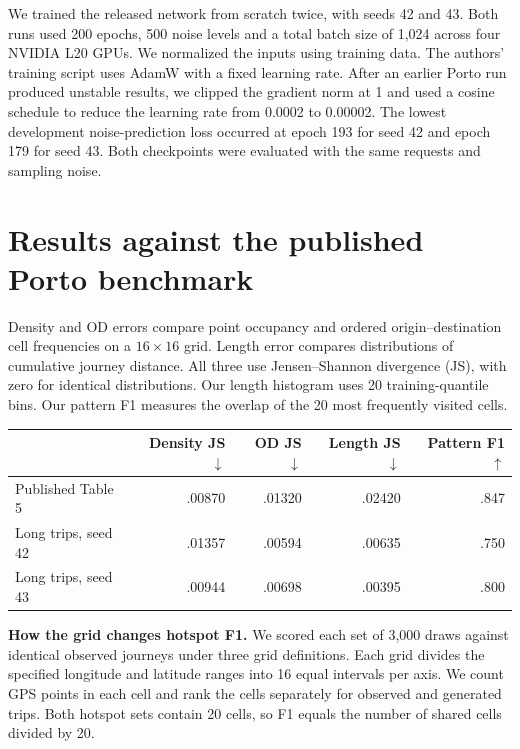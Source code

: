 \documentclass[11pt,a4paper]{article}
\begin{document}
We trained the released network from scratch twice, with seeds 42 and 43. Both runs used 200 epochs, 500 noise levels and a total batch size of 1,024 across four NVIDIA L20 GPUs. We normalized the inputs using training data. The authors' training script uses AdamW with a fixed learning rate. After an earlier Porto run produced unstable results, we clipped the gradient norm at 1 and used a cosine schedule to reduce the learning rate from 0.0002 to 0.00002. The lowest development noise-prediction loss occurred at epoch 193 for seed 42 and epoch 179 for seed 43. Both checkpoints were evaluated with the same requests and sampling noise.

\newpage
\section*{Results against the published Porto benchmark}
Density and OD errors compare point occupancy and ordered origin--destination cell frequencies on a $16\times16$ grid. Length error compares distributions of cumulative journey distance. All three use Jensen--Shannon divergence (JS), with zero for identical distributions. Our length histogram uses 20 training-quantile bins. Our pattern F1 measures the overlap of the 20 most frequently visited cells.

\begin{center}
\begin{tabular}{lrrrr}\toprule
 & Density JS $\downarrow$ & OD JS $\downarrow$ & Length JS $\downarrow$ & Pattern F1 $\uparrow$\\\midrule
Published Table 5 & .00870 & .01320 & .02420 & .847\\
Long trips, seed 42 & .01357 & .00594 & .00635 & .750\\
Long trips, seed 43 & .00944 & .00698 & .00395 & .800\\
\bottomrule\end{tabular}
\end{center}

\textbf{How the grid changes hotspot F1.} We scored each set of 3,000 draws against identical observed journeys under three grid definitions. Each grid divides the specified longitude and latitude ranges into 16 equal intervals per axis. We count GPS points in each cell and rank the cells separately for observed and generated trips. Both hotspot sets contain 20 cells, so F1 equals the number of shared cells divided by 20.
\end{document}
